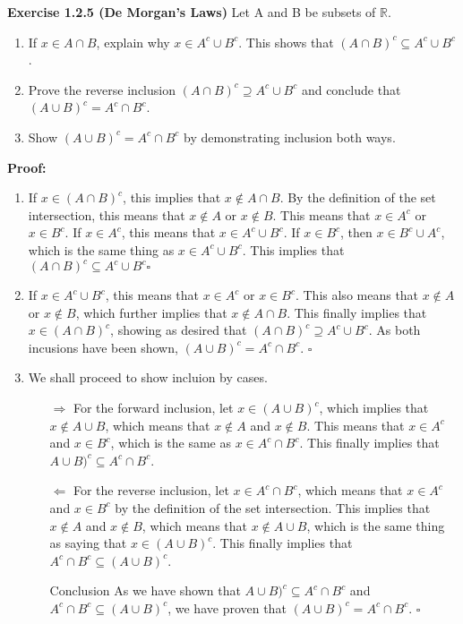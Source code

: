 \documentclass[12 pt]{article}
\newcommand{\qed}[0]{$\square$}
\begin{document}
 
\textbf{Exercise 1.2.5 (De Morgan's Laws)} Let A and B be subsets of \(\mathbb{R}\).

\begin{enumerate}
\item If \(x \in A \cap B\), explain why \(x \in A^c \cup B^c\). This shows that \((A \cap B)^c \subseteq A^c \cup B^c\).
\item Prove the reverse inclusion \((A \cap B)^c \supseteq A^c \cup B^c\) and conclude that \((A \cup B)^c = A^c \cap B^c\).
\item Show \((A \cup B)^c = A^c \cap B^c\) by demonstrating inclusion both ways.
\end{enumerate}

\vspace{5mm}
\textbf{Proof:}
\begin{enumerate}
\item If \(x \in (A \cap B)^c\), this implies that \(x \not \in A \cap B\). By the definition of the set intersection, this means that \(x \not \in A\) or \(x \not \in B\). This means that \(x \in A^c\) or \(x \in B^c\). If \(x \in A^c\), this means that \(x \in A^c \cup B^c\). If \(x \in B^c\), then \(x \in B^c \cup A^c\), which is the same thing as \(x \in  A^c \cup B^c\). This implies that \((A \cap B)^c \subseteq A^c \cup B^c \)\qed

\item If $x \in A^c \cup B^c$, this means that $x \in A^c$ or $x \in B^c$. This also means that $x \not \in  A$ or $x \not \in B$, which further implies that $x \not \in A \cap B$. This finally implies that $x \in (A \cap B)^c$, showing as desired that \((A \cap B)^c \supseteq A^c \cup B^c\). As both incusions have been shown, \((A \cup B)^c = A^c \cap B^c\). \qed

\item We shall proceed to show incluion by cases.
\begin{enumerate}
\item[\(\Rightarrow\)] For the forward inclusion, let \(x \in (A \cup B)^c\), which implies that \(x \not \in A \cup B\), which means that \(x \not \in A\) and \(x \not \in B\). This means that \(x \in A^c\) and \(x \in B^c\), which is the same as \(x \in A^c \cap B^c\). This finally implies that \(A \cup B)^{c} \subseteq A^{c} \cap B^{c}\).

\item[\(\Leftarrow\)] For the reverse inclusion, let \(x \in A^c \cap B^c\), which means that \(x \in A^c\) and \(x \in B^c\) by the definition of the set intersection. This implies that \(x \not \in A\) and \(x \not \in B\), which means that \(x \not \in A \cup B\), which is the same thing as saying that \(x \in (A \cup B)^c\). This finally implies that \(A^{c} \cap B^{c} \subseteq (A \cup B)^{c}\).
\item[Conclusion] As we have shown that \(A \cup B)^{c} \subseteq A^{c} \cap B^{c}\) and \(A^{c} \cap B^{c} \subseteq (A \cup B)^{c}\), we have proven that \((A \cup B)^c = A^c \cap B^c\). \qed
\end{enumerate}
\end{enumerate}
\end{document}
